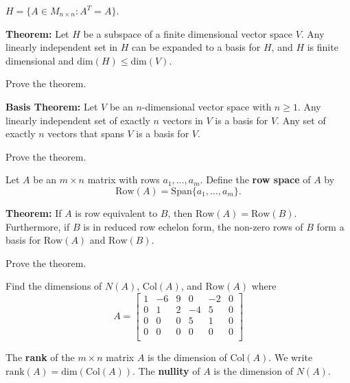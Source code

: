 \begin{enumerate}
\vfill

\Part $H=\{ A \in M_{n \times n} : A^{T}=A \}$.

\vfill

\newpage

{\bf Theorem:} Let $H$ be a subspace of a finite dimensional vector space $V$. Any linearly independent set in $H$ can be expanded to a basis for $H$, and $H$ is finite dimensional and $\text{dim}(H)\leq \text{dim}(V)$.

\Problem Prove the theorem.

\vfill

{\bf Basis Theorem:} Let $V$ be an $n$-dimensional vector space with $n\geq 1$. Any linearly independent set of exactly $n$ vectors in $V$ is a basis for $V$. Any set of exactly $n$ vectors that spans $V$ is a basis for $V$.

\Problem Prove the theorem.

\vfill

\newpage

\begin{defn} Let $A$ be an $m\times n$ matrix with rows $a_1, \dots, a_m$. Define the {\bf row space} of $A$ by $$\text{Row}(A)=\text{Span}\{a_1, \dots, a_m\}.$$
\end{defn}

{\bf Theorem:} If $A$ is row equivalent to $B$, then $\text{Row}(A)=\text{Row}(B)$. Furthermore, if $B$ is in reduced row echelon form, the non-zero rows of $B$ form a basis for $\text{Row}(A)$ and $\text{Row}(B)$.

\Problem Prove the theorem.

\vfill

\Problem Find the dimensions of $N(A)$, $\text{Col}(A)$, and $\text{Row}(A)$ where $$A=\begin{bmatrix}
1 & -6 & 9 &0 &-2 & 0\\
0 & 1 & 2 & -4 & 5 &0\\
0 & 0 &0 & 5 & 1 &0\\
0 & 0 &0 &0 &0 &0\\
\end{bmatrix}$$

\vfill

\begin{defn}
The {\bf rank} of the $m\times n$ matrix $A$ is the dimension of $\text{Col}(A)$. We write $\text{rank}(A)=\text{dim}(\text{Col}(A))$. The {\bf nullity} of $A$ is the dimension of $N(A)$. 
\end{defn}

\newpage


\end{enumerate}
